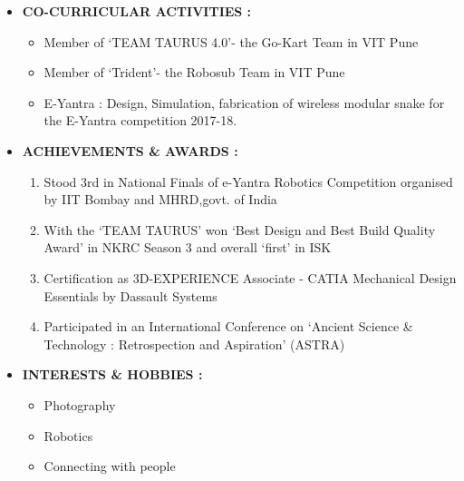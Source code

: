\documentclass[11pt]{article}
\begin{document}
\begin{itemize}[label=$\star$]
		\bigskip
		\item	\begin{large} \textbf{CO-CURRICULAR ACTIVITIES :} \end{large}
		\begin{itemize}[label=$\bullet$]
			\item Member of ‘TEAM TAURUS 4.0’- the Go-Kart Team in VIT Pune
			\item Member of ‘Trident’- the Robosub Team in VIT Pune
			\item E-Yantra : Design, Simulation, fabrication of wireless modular snake for the E-Yantra competition 2017-18.
		\end{itemize}
		\newpage
		\item	\begin{large} \textbf{ACHIEVEMENTS \& AWARDS :} \end{large}
		\begin{enumerate}
			\item Stood 3rd in National Finals of e-Yantra Robotics Competition organised by IIT Bombay and 
			MHRD,govt. of India
			\item With the ‘TEAM TAURUS’ won ‘Best Design and Best Build Quality Award’ in NKRC Season 3 and overall ‘first’ in ISK 
			\item Certification as 3D-EXPERIENCE Associate - CATIA Mechanical Design Essentials by Dassault Systems
			\item Participated in an International Conference on ‘Ancient Science \& Technology : Retrospection and Aspiration’ (ASTRA)
		\end{enumerate}
		\bigskip
		\item	\begin{large} \textbf{INTERESTS \& HOBBIES :} \end{large}
		\begin{itemize}[label=$\bullet$]
			\item Photography
			\item Robotics
			\item Connecting with people
		\end{itemize}

\end{itemize}
\end{document}
